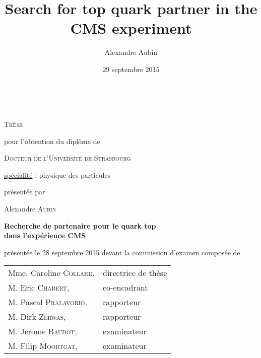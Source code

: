 


\title{Search for top quark partner in the CMS experiment}
\author{Alexandre Aubin}
\date{29 septembre 2015}

\begin{titlepage}
    \vspace*{1cm}
    \begin{center}
        \\

        \vspace*{0.8cm}

        {\Large \textsc{Thèse}}

        \vspace*{0.8cm}

        pour l'obtention du diplôme de

        \vspace*{0.8cm}

        {\Large \textsc{Docteur de l'Université de Strasbourg}}

        \vspace*{0.8cm}

        \underline{spécialité} : physique des particules

        \vspace*{0.8cm}

        présentée par

        Alexandre \textsc{Aubin}

        \vspace*{0.8cm}

        {\Large \textbf{Recherche de partenaire pour le quark top\\ dans l'expérience CMS}}

        \vspace*{0.8cm}

        présentée le 28 septembre 2015 devant la commission d'examen composée de

        \vspace*{0.8cm}

        \begin{tabular}{ll}
            Mme. Caroline \textsc{Collard}, & directrice de thèse\\
            M. Eric \textsc{Chabert},       & co-encadrant\\
            M. Pascal \textsc{Pralavorio},  & rapporteur\\
            M. Dirk \textsc{Zerwas},        & rapporteur\\
            M. Jerome \textsc{Baudot},      & examinateur\\
            M. Filip \textsc{Moortgat},     & examinateur\\
        \end{tabular}

        \vspace*{0.5cm}

    \end{center}
    \vspace*{1cm}
\end{titlepage}
\restoregeometry
